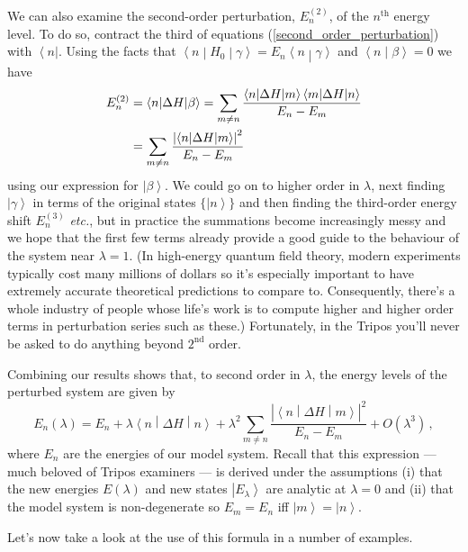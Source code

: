 \documentclass{article}
\theoremstyle{plain}\theoremheaderfont{\normalfont\itshape}\theorembodyfont{\rmfamily}\theoremseparator{.}\newtheorem*{rem}{Remark}\newtheorem*{ex}{Example}\newtheorem*{proof}{Proof}\newtheorem*{altp}{Alternative proof}
\theoremstyle{plain}\theoremheaderfont{\normalfont\bfseries}\theorembodyfont{\rmfamily}\theoremseparator{.}\newtheorem{thm}{Theorem}[section]\newtheorem{lem}[thm]{Lemma}\newtheorem{prop}[thm]{Proposition}\newtheorem*{cor}{Corollary}\newtheorem{defn}[thm]{Definition}\newtheorem{clm}[thm]{Claim}\newtheorem{clminproof}{Claim}
\theoremstyle{break}\theoremheaderfont{\normalfont\itshape}\theorembodyfont{\rmfamily}\theoremseparator{.\medskip}\newtheorem*{proofskip}{Proof}\newtheorem*{exs}{Examples}\newtheorem*{rems}{Remarks}
\theoremstyle{break}\theoremheaderfont{\normalfont\bfseries}\theorembodyfont{\rmfamily}\theoremseparator{.\medskip}\newtheorem{lemskip}[thm]{Lemma}\newtheorem{defnskip}[thm]{Definition}\newtheorem{propskip}[thm]{Proposition}\newtheorem{thmskip}[thm]{Theorem}
\numberwithin{equation}{section}
\newcommand{\bra}[1]{\left\langle #1 \right|}
\newcommand{\ket}[1]{\left| #1 \right\rangle}
\newcommand{\braket}[2]{\left\langle #1 \middle| #2 \right\rangle}
\newcommand{\mel}[3]{\left\langle #1 \middle| #2 \middle| #3 \right\rangle}
\newcommand{\abs}[1]{\left| #1 \right|}
\begin{document}
    We can also examine the second-order perturbation, \(E_n^{(2)}\), of the \(n^{\text{th}}\) energy level. To do so, contract the third of equations (\ref{second_order_perturbation}) with \(\bra{n}\). Using the facts that \(\mel{n}{H_0}{\gamma}=E_n\braket{n}{\gamma}\) and \(\braket{n}{\beta}=0\) we have
    \begin{align}
        E_n^{(2)}&=\mel{n}{\Delta H}{\beta}=\sum_{m\ne n}\frac{\mel{n}{\Delta H}{m}\mel{m}{\Delta H}{n}}{E_n - E_m}\notag\\
        &=\sum_{m\ne n}\frac{\abs{\mel{n}{\Delta H}{m}}^2}{E_n-E_m}\label{second_order_perturbation_energy}
    \end{align}
    using our expression for \(\ket{\beta}\). We could go on to higher order in \(\lambda\), next finding \(\ket{\gamma}\) in terms of the original states \(\{\ket{n}\}\) and then finding the third-order energy shift \(E_n^{(3)}\) \textit{etc.}, but in practice the summations become increasingly messy and we hope that the first few terms already provide a good guide to the behaviour of the system near \(\lambda=1\). (In high-energy quantum field theory, modern experiments typically cost many millions of dollars so it's especially important to have extremely accurate theoretical predictions to compare to. Consequently, there's a whole industry of people whose life's work is to compute higher and higher order terms in perturbation series such as these.) Fortunately, in the Tripos you'll never be asked to do anything beyond \(2^{\text{nd}}\) order.

    Combining our results shows that, to second order in \(\lambda\), the energy levels of the perturbed system are given by
    \begin{equation}
        E_n(\lambda)=E_n+\lambda\mel{n}{\Delta H}{n}+\lambda^2\sum_{m\ne n}\frac{\abs{\mel{n}{\Delta H}{m}}^2}{E_n - E_m}+O(\lambda^3)\,,
    \end{equation}
    where \(E_n\) are the energies of our model system. Recall that this expression --- much beloved of Tripos examiners --- is derived under the assumptions (i) that the new energies \(E(\lambda)\) and new states \(\ket{E_\lambda}\) are analytic at \(\lambda=0\) and (ii) that the model system is non-degenerate so \(E_m=E_n\) iff \(\ket{m}=\ket{n}\).
    
    Let's now take a look at the use of this formula in a number of examples.
\end{document}
